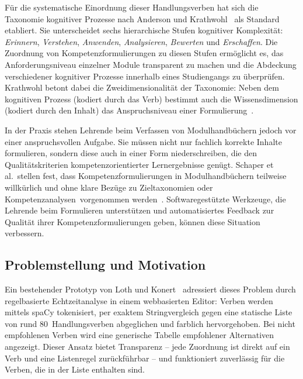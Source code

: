 Für die systematische Einordnung dieser Handlungsverben hat sich die Taxonomie kognitiver Prozesse nach Anderson und Krathwohl~\cite{anderson2001taxonomy} als Standard etabliert.
Sie unterscheidet sechs hierarchische Stufen kognitiver Komplexität: \emph{Erinnern}, \emph{Verstehen}, \emph{Anwenden}, \emph{Analysieren}, \emph{Bewerten} und \emph{Erschaffen}.
Die Zuordnung von Kompetenzformulierungen zu diesen Stufen ermöglicht es, das Anforderungsniveau einzelner Module transparent zu machen und die Abdeckung verschiedener kognitiver Prozesse innerhalb eines Studiengangs zu überprüfen.
Krathwohl betont dabei die Zweidimensionalität der Taxonomie: Neben dem kognitiven Prozess (kodiert durch das Verb) bestimmt auch die Wissensdimension (kodiert durch den Inhalt) das Anspruchsniveau einer Formulierung~\cite{krathwohl2002revision}.

In der Praxis stehen Lehrende beim Verfassen von Modulhandbüchern jedoch vor einer anspruchsvollen Aufgabe.
Sie müssen nicht nur fachlich korrekte Inhalte formulieren, sondern diese auch in einer Form niederschreiben, die den Qualitätskriterien kompetenzorientierter Lernergebnisse genügt.
Schaper et al.\ stellen fest, dass Kompetenzformulierungen in Modulhandbüchern \glqq teilweise willkürlich und ohne klare Bezüge zu Zieltaxonomien oder Kompetenzanalysen\grqq\ vorgenommen werden~\cite{schaper2012fachgutachten}.
Softwaregestützte Werkzeuge, die Lehrende beim Formulieren unterstützen und automatisiertes Feedback zur Qualität ihrer Kompetenzformulierungen geben, können diese Situation verbessern.

%
\subsection{Problemstellung und Motivation}\label{sec:problemstellung}

Ein bestehender Prototyp von Loth und Konert~\cite{loth2022kompetenzeditor} adressiert dieses Problem durch regelbasierte Echtzeitanalyse in einem webbasierten Editor: Verben werden mittels spaCy tokenisiert, per exaktem Stringvergleich gegen eine statische Liste von rund 80~Handlungsverben abgeglichen und farblich hervorgehoben.
Bei nicht empfohlenen Verben wird eine generische Tabelle empfohlener Alternativen angezeigt.
Dieser Ansatz bietet Transparenz -- jede Zuordnung ist direkt auf ein Verb und eine Listenregel zurückführbar -- und funktioniert zuverlässig für die Verben, die in der Liste enthalten sind.

